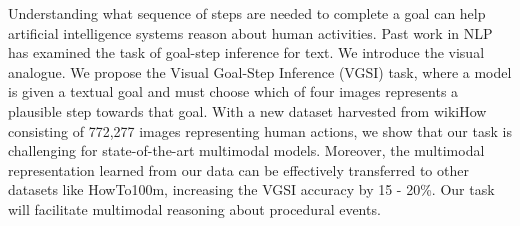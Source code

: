 Understanding what sequence of steps are needed to complete a goal can help artificial intelligence systems reason about human activities. Past work in NLP has examined the task of goal-step inference for text. We introduce the visual analogue. We propose the Visual Goal-Step Inference (VGSI) task, where a model is given a textual goal and must choose which of four images represents a plausible step towards that goal. With a new dataset harvested from wikiHow consisting of 772,277 images representing human actions, we show that our task is challenging for state-of-the-art multimodal models. Moreover, the multimodal representation learned from our data can be effectively transferred to other datasets like HowTo100m, increasing the VGSI accuracy by 15 - 20\%. Our task will facilitate multimodal reasoning about procedural events.
